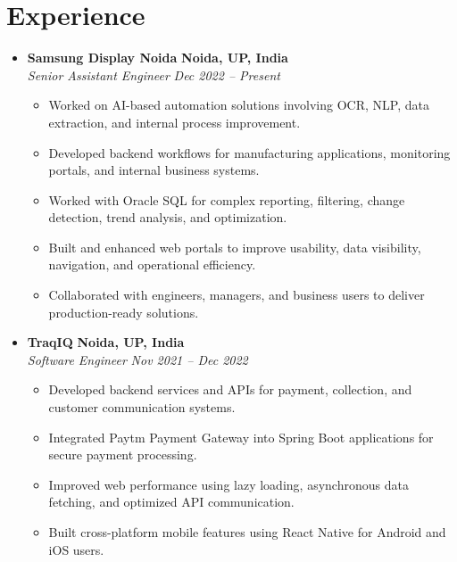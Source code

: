 \documentclass[10pt, a4paper]{article}
\begin{document}
\section*{Experience}
\begin{itemize}[leftmargin=0pt, itemsep=0.8ex, topsep=0.3ex]

    \item
    \textbf{Samsung Display Noida} \hfill \textbf{Noida, UP, India} \\
    \textit{Senior Assistant Engineer} \hfill \textit{Dec 2022 -- Present}
    \begin{itemize}[leftmargin=1.5em, itemsep=0.25ex, topsep=0.25ex]
        \item Worked on AI-based automation solutions involving OCR, NLP, data extraction, and internal process improvement.
        \item Developed backend workflows for manufacturing applications, monitoring portals, and internal business systems.
        \item Worked with Oracle SQL for complex reporting, filtering, change detection, trend analysis, and optimization.
        \item Built and enhanced web portals to improve usability, data visibility, navigation, and operational efficiency.
        \item Collaborated with engineers, managers, and business users to deliver production-ready solutions.
    \end{itemize}

    \item
    \textbf{TraqIQ} \hfill \textbf{Noida, UP, India} \\
    \textit{Software Engineer} \hfill \textit{Nov 2021 -- Dec 2022}
    \begin{itemize}[leftmargin=1.5em, itemsep=0.25ex, topsep=0.25ex]
        \item Developed backend services and APIs for payment, collection, and customer communication systems.
        \item Integrated Paytm Payment Gateway into Spring Boot applications for secure payment processing.
        \item Improved web performance using lazy loading, asynchronous data fetching, and optimized API communication.
        \item Built cross-platform mobile features using React Native for Android and iOS users.
    \end{itemize}


\end{itemize}
\end{document}
